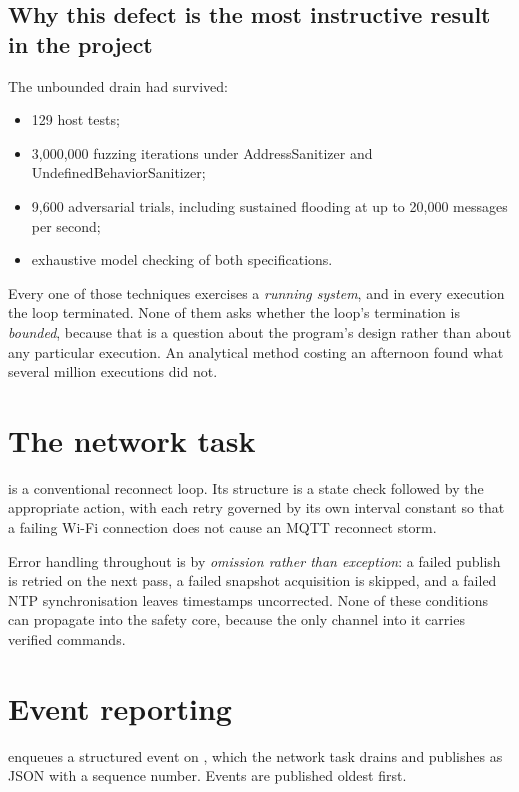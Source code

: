 \subsection{Why this defect is the most instructive result in the project}

The unbounded drain had survived:

\begin{itemize}[leftmargin=1.6em,itemsep=3pt]
  \item 129 host tests;
  \item 3,000,000 fuzzing iterations under AddressSanitizer and UndefinedBehaviorSanitizer;
  \item 9,600 adversarial trials, including sustained flooding at up to 20,000 messages per
        second;
  \item exhaustive model checking of both specifications.
\end{itemize}

Every one of those techniques exercises a \emph{running system}, and in every execution the loop
terminated. None of them asks whether the loop's termination is \emph{bounded}, because that is
a question about the program's design rather than about any particular execution. An analytical
method costing an afternoon found what several million executions did not.

\section{The network task}

 is a conventional reconnect loop. Its structure is a state check followed
by the appropriate action, with each retry governed by its own interval constant so that a
failing Wi-Fi connection does not cause an MQTT reconnect storm.

Error handling throughout is by \emph{omission rather than exception}: a failed publish is
retried on the next pass, a failed snapshot acquisition is skipped, and a failed NTP
synchronisation leaves timestamps uncorrected. None of these conditions can propagate into the
safety core, because the only channel into it carries verified commands.

\section{Event reporting}

 enqueues a structured event on , which the network task drains
and publishes as JSON with a sequence number. Events are published oldest first.

